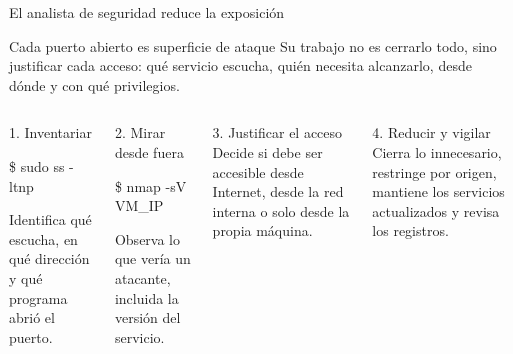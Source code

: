 \documentclass[aspectratio=169,10pt,c]{beamer}
\begin{document}
\begin{frame}{El analista de seguridad reduce la exposición}
\begin{block}{Cada puerto abierto es superficie de ataque}
\small Su trabajo no es cerrarlo todo, sino justificar cada acceso: qué servicio escucha, quién necesita alcanzarlo, desde dónde y con qué privilegios.
\end{block}
\begin{columns}[T,onlytextwidth]
\begin{exampleblock}{1. Inventariar}
\begin{terminal}\footnotesize
\$ sudo ss -ltnp
\end{terminal}
\small Identifica qué escucha, en qué dirección y qué programa abrió el puerto.
\end{exampleblock}
\begin{exampleblock}{2. Mirar desde fuera}
\begin{terminal}\footnotesize
\$ nmap -sV VM\_IP
\end{terminal}
\small Observa lo que vería un atacante, incluida la versión del servicio.
\end{exampleblock}
\begin{exampleblock}{3. Justificar el acceso}
\small Decide si debe ser accesible desde Internet, desde la red interna o solo desde la propia máquina.
\end{exampleblock}
\begin{exampleblock}{4. Reducir y vigilar}
\small Cierra lo innecesario, restringe por origen, mantiene los servicios actualizados y revisa los registros.
\end{exampleblock}
\end{columns}
\end{frame}
\end{document}
